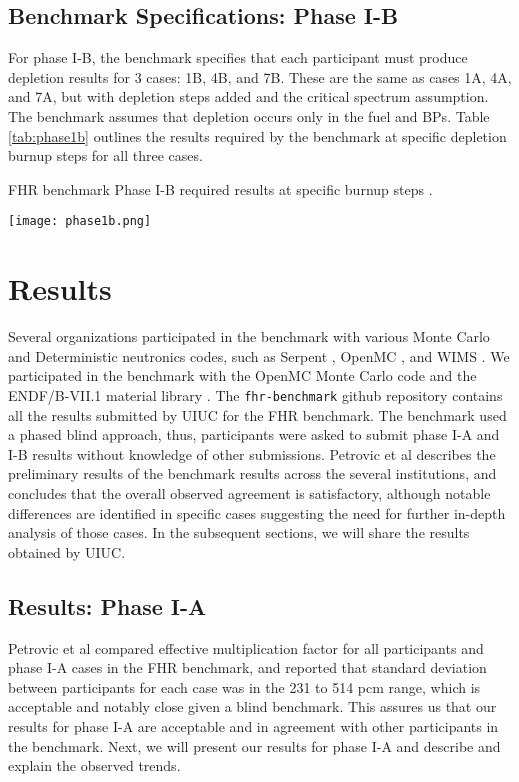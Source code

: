 \subsection{Benchmark Specifications: Phase I-B}
For phase I-B, the benchmark specifies that each participant must produce 
depletion results for 3 cases: 1B, 4B, and 7B. 
These are the same as cases 1A, 4A, and 7A, but with depletion steps added and
the critical spectrum assumption. 
The benchmark assumes that depletion occurs only in the fuel and \glspl{BP}. 
Table \ref{tab:phase1b} outlines the results required by the benchmark at specific 
depletion burnup steps for all three cases. 

\begin{table}
    \centering
    \caption{\gls{FHR} benchmark Phase I-B required results at specific burnup 
    steps \cite{noauthor_fluoride_nodate}.}
    \label{tab:phase1b}
    \texttt{[image: phase1b.png]}
  \end{table}

\section{Results}
Several organizations participated in the benchmark with various Monte Carlo
and Deterministic neutronics codes, such as Serpent \cite{leppanen_serpent_2014}, 
OpenMC \cite{romano_openmc_2013}, and WIMS \cite{lindley_current_2017}. 
We participated in the benchmark with the OpenMC Monte Carlo code 
\cite{romano_openmc_2013} and the ENDF/B-VII.1 material library 
\cite{chadwick_endf/b-vii.1_2011}.
The \texttt{fhr-benchmark} github repository contains all the results submitted 
by \gls{UIUC} for the \gls{FHR} benchmark. 
The benchmark used a phased blind approach, thus, participants were asked to 
submit phase I-A and I-B results without knowledge of other submissions. 
Petrovic et al describes the preliminary results of the benchmark results 
across the several institutions, and concludes that the overall observed agreement 
is satisfactory, although notable differences are identified in specific cases 
suggesting the need for further in-depth analysis of those cases. 
In the subsequent sections, we will share the results obtained by \gls{UIUC}.  

\subsection{Results: Phase I-A}
Petrovic et al \cite{petrovic_preliminary_2021} compared effective multiplication 
factor for all participants and phase I-A cases in the \gls{FHR} benchmark, 
and reported that standard deviation between participants for each case was in 
the 231 to 514 pcm range, which is acceptable and notably close given a blind 
benchmark.
This assures us that our results for phase I-A are acceptable and in agreement 
with other participants in the benchmark. 
Next, we will present our results for phase I-A and describe and explain the 
observed trends.

